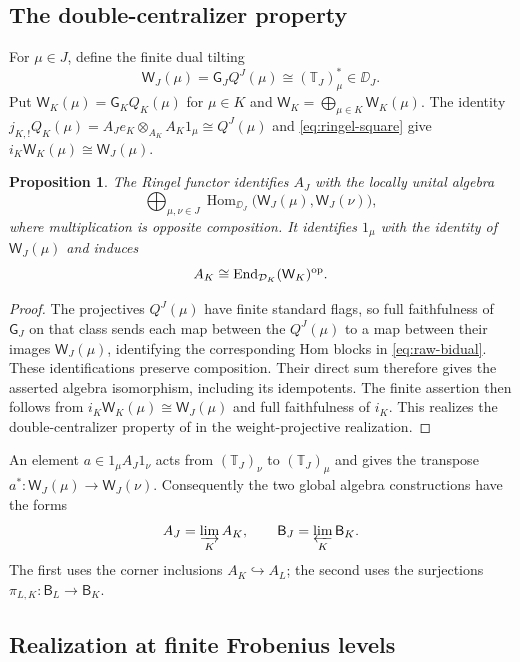 \documentclass[11pt,reqno]{amsart}
\newcommand{\Hom}{\operatorname{Hom}}\newcommand{\End}{\operatorname{End}}\newcommand{\Ext}{\operatorname{Ext}}
\newcommand{\BJ}{\mathsf B_J}\newcommand{\BK}{\mathsf B_K}\newcommand{\TJ}{\mathbb T_J}\newcommand{\GK}{\mathsf G_K}\newcommand{\GJ}{\mathsf G_J}
\newtheorem{proposition}[theorem]{Proposition}
\theoremstyle{definition}
\theoremstyle{remark}
\numberwithin{equation}{section}
\begin{document}
\subsection{The double-centralizer property}

For $\mu\in J$, define the finite dual tilting
\[
 \mathsf W_J(\mu)=\GJ Q^J(\mu)
                 \cong(\TJ)_\mu^*\in\DD_J.
\]
Put
$\mathsf W_K(\mu)=\GK Q_K(\mu)$ for $\mu\in K$ and
$\mathsf W_K=\bigoplus_{\mu\in K}\mathsf W_K(\mu)$.
The identity
$j_{K,!}Q_K(\mu)=A_Je_K\otimes_{A_K}A_K1_\mu\cong Q^J(\mu)$
and \eqref{eq:ringel-square} give
$i_K\mathsf W_K(\mu)\cong\mathsf W_J(\mu)$.

\begin{proposition}\label{prop:raw-bidual}
The Ringel functor identifies $A_J$ with the locally unital algebra
\begin{equation}\label{eq:raw-bidual}
 \bigoplus_{\mu,\nu\in J}
 \Hom_{\DD_J}\bigl(\mathsf W_J(\mu),\mathsf W_J(\nu)\bigr),
\end{equation}
where multiplication is opposite composition. It identifies
$1_\mu$ with the identity of $\mathsf W_J(\mu)$ and induces
\[
 A_K\cong\End_{\DD_K}(\mathsf W_K)^{\op}.
\]
\end{proposition}

\begin{proof}
The projectives $Q^J(\mu)$ have finite standard flags, so full
faithfulness of $\GJ$ on that class sends each map between the
$Q^J(\mu)$ to a map between their images $\mathsf W_J(\mu)$,
identifying the corresponding Hom blocks in \eqref{eq:raw-bidual}.
These identifications
preserve composition. Their direct sum therefore gives the asserted
algebra isomorphism, including its idempotents. The finite assertion
then follows from $i_K\mathsf W_K(\mu)\cong\mathsf W_J(\mu)$
and full faithfulness of $i_K$. This realizes the
double-centralizer property of
\cite[Corollary~4.30]{BS} in the weight-projective realization.
\end{proof}

An element $a\in1_\mu A_J1_\nu$ acts from $(\TJ)_\nu$ to
$(\TJ)_\mu$ and gives the transpose
$a^*:\mathsf W_J(\mu)\to\mathsf W_J(\nu)$.
Consequently the two global algebra constructions have the forms
\[
 A_J=\varinjlim_K A_K,
 \qquad
 \BJ=\varprojlim_K\BK.
\]
The first uses the corner inclusions $A_K\hookrightarrow A_L$;
the second uses the surjections $\pi_{L,K}:\mathsf B_L\to\BK$.

\subsection{Realization at finite Frobenius levels}
\end{document}
